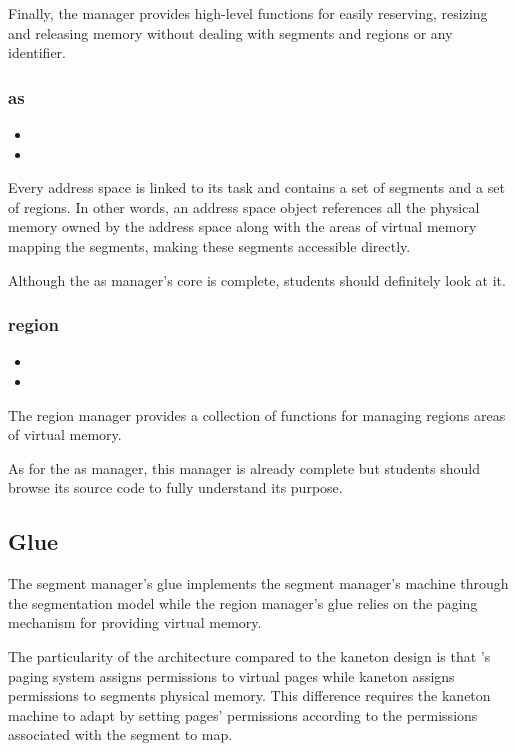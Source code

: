 Finally, the  manager provides high-level functions for easily
reserving, resizing and releasing memory without dealing with segments and
regions or any identifier.

\subsubsection*{as}

\begin{itemize}
  \item
  \item
\end{itemize}

Every address space is linked to its task and contains a set of segments
and a set of regions. In other words, an address space object references all
the physical memory owned by the address space along with the areas of
virtual memory mapping the segments, making these segments accessible directly.

Although the as manager's core is complete, students should definitely look at
it.

\subsubsection*{region}

\begin{itemize}
  \item
  \item
\end{itemize}

The region manager provides a collection of functions for managing regions
\ie{} areas of virtual memory.

As for the as manager, this manager is already complete but students
should browse its source code to fully understand its purpose.

\subsection{Glue}

The segment manager's glue implements the segment manager's machine through
the  segmentation model while the region manager's glue relies on
the paging mechanism for providing virtual memory.

The particularity of the  architecture compared to the kaneton
design is that 's paging system assigns permissions to virtual
pages while kaneton assigns permissions to segments \ie{} physical memory.
This difference requires the kaneton machine to adapt by setting pages'
permissions according to the permissions associated with the segment to map.

